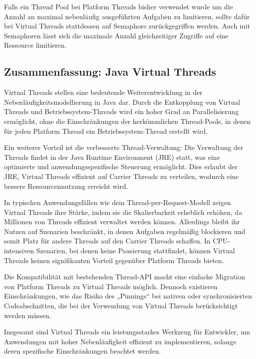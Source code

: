 \documentclass[fontsize=12pt,paper=a4,twoside=semi,parskip=half-,headsepline,headinclude]{scrreprt}
\begin{document}
Falls ein Thread Pool bei Platform Threads bisher verwendet wurde um die Anzahl an maximal nebenläufig ausgeführten Aufgaben zu limitieren, sollte dafür bei Virtual Threads stattdessen auf Semaphore zurückgegriffen werden. Auch mit Semaphoren lässt sich die maximale Anzahl gleichzeitiger Zugriffe auf eine Ressource limitieren.

\subsection{Zusammenfassung: Java Virtual Threads}

Virtual Threads stellen eine bedeutende Weiterentwicklung in der Nebenläufigkeitsmodellierung in Java dar. Durch die Entkopplung von Virtual Threads und Betriebssystem-Threads wird ein hoher Grad an Parallelisierung ermöglicht, ohne die Einschränkungen der herkömmlichen Thread-Pools, in denen für jeden Platform Thread ein Betriebssystem-Thread erstellt wird.

Ein weiterer Vorteil ist die verbesserte Thread-Verwaltung: Die Verwaltung der Threads findet in der Java Runtime Environment (JRE) statt, was eine optimierte und anwendungsspezifische Steuerung ermöglicht. Dies erlaubt der JRE, Virtual Threads effizient auf Carrier Threads zu verteilen, wodurch eine bessere Ressourcennutzung erreicht wird.

In typischen Anwendungsfällen wie dem Thread-per-Request-Modell zeigen Virtual Threads ihre Stärke, indem sie die Skalierbarkeit erheblich erhöhen, da Millionen von Threads effizient verwaltet werden können. Allerdings bleibt ihr Nutzen auf Szenarien beschränkt, in denen Aufgaben regelmäßig blockieren und somit Platz für andere Threads auf den Carrier Threads schaffen. In CPU-intensiven Szenarien, bei denen keine Pausierung stattfindet, können Virtual Threads keinen signifikanten Vorteil gegenüber Platform Threads bieten.

Die Kompatibilität mit bestehenden Thread-API macht eine einfache Migration von Platform Threads zu Virtual Threads möglich. Dennoch existieren Einschränkungen, wie das Risiko des „Pinnings“ bei nativen oder synchronisierten Codeabschnitten, die bei der Verwendung von Virtual Threads berücksichtigt werden müssen.

Insgesamt sind Virtual Threads ein leistungsstarkes Werkzeug für Entwickler, um Anwendungen mit hoher Nebenläufigkeit effizient zu implementieren, solange deren spezifische Einschränkungen beachtet werden.

\newpage
\end{document}
